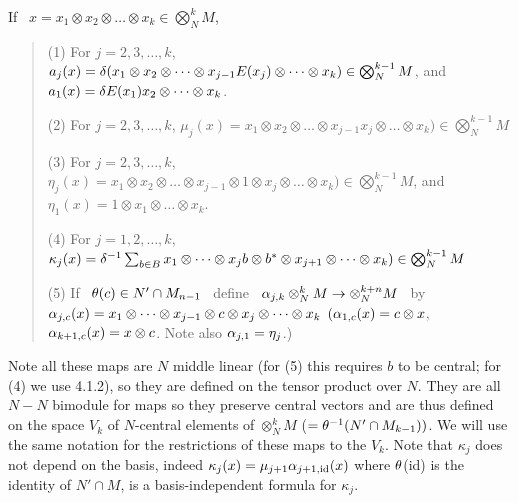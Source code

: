  If \ $x=
x_1\otimes x_2\otimes\dots\otimes x_k\in \bigotimes^k_N M$,
\begin{verse}
(1) For $j=2,3,\dots ,k$, \newline
$a_j(x)=\delta(x_1\otimes x_2\otimes\dots\otimes x_{j-1}
E(x_j)\otimes\dots\otimes x_k)\in \bigotimes^{k-1}_N M$,\newline
 and \ $a_1(x)=\delta E(x_1)x_2 \otimes\dots\otimes x_k$.

(2) For $j=2,3,\dots ,k$, \newline
$\mu_j(x)=x_1\otimes x_2\otimes\dots\otimes x_{j-1}x_j
\otimes\dots\otimes x_k)\in \bigotimes^{k-1}_N M$

(3) For $j=2,3,\dots ,k$, \newline
$\eta_j(x)=x_1\otimes x_2\otimes\dots\otimes x_{j-1}\otimes 1
\otimes x_j
\otimes\dots\otimes x_k)\in \bigotimes^{k-1}_N M$,\newline
and \ $\eta_1(x) = 1\otimes x_1\otimes\dots\otimes x_k$.

(4) For $j=1,2,\dots ,k$,\newline
$\kappa_j(x)=\delta^{-1}\sum_{b\in B}
x_1\otimes\dots\otimes x_jb\otimes b^*\otimes
x_{j+1}\otimes\dots\otimes x_k)\in \bigotimes^{k-1}_N M$

(5) If \ $\theta(c)\in N'\cap M_{n-1}$ \ define \
$\alpha_{j,k}\otimes^k_N M\to\otimes^{k+n}_N M$ \ by\newline
$\alpha_{j,c}(x)=x_1\otimes\dots\otimes x_{j-1}\otimes c
\otimes x_j\otimes\dots\otimes x_k$\newline
$(\alpha_{1,c}(x)=c\otimes x$, $\alpha_{k+1,c}(x)=x\otimes c$.
Note also $\alpha_{j,1}=\eta_j$.)
\end{verse}
Note all these maps are $N$ middle linear (for (5)
this requires $b$ to be central; for (4) we use 4.1.2),
so they are defined on the tensor product over $N$.
They are all $N\!-\!N$ bimodule for maps so they preserve central
vectors and are thus defined on the space $V_k$ of $N$-central
elements of $\otimes^k_N M$ ($=\theta^{-1}(N'\cap M_{k-1}))$.
We will use the same notation for the restrictions
of these maps to the $V_k$. Note that $\kappa_j$ does not depend on the
basis, indeed $\kappa_j(x)=\mu_{j+1}\alpha_{j+1,{\scriptstyle{\rm id}}}(x)$ where
$\theta$(id) is the identity of $N'\cap M$, is a basis-independent
formula for $\kappa_j$.



